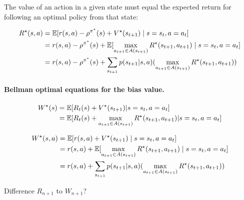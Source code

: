 \documentclass[envcountsame]{llncs}
\begin{document}
The value of an action in a given state must equal the expected return for following an optimal
policy from that state:

\begin{align*}
  R^{\star}(s,a) & = \operatorname*{\mathbb{E}} [ r(s,a) - \rho^{\pi^{\star}}(s) + V^{\star}(s_{t+1})  \mid s=s_{t},a=a_{t} ]\\
                 & = r(s,a) - \rho^{\pi^{\star}}(s) + \operatorname*{\mathbb{E}} [ \max_{a_{t+1} \in A(s_{t+1})}R^{\star}(s_{t+1},a_{t+1}) \mid s=s_{t},a=a_{t}]\\
                 & = r(s,a) - \rho^{\pi^{\star}}(s) + \sum_{s_{t+1}} p(s_{t+1} | s, a) (\max_{a_{t+1} \in A(s_{t+1})} R^{\star}(s_{t+1},a_{t+1}))
\end{align*}

\paragraph*{Bellman optimal equations for the bias value.}


\begin{align*}
  W^{\star}(s) & = \operatorname*{\mathbb{E}} [ R_{t}(s) + V^{\star}(s_{t+1}) | s = s_{t}, a=a_{t} ]\\
               & = \operatorname*{\mathbb{E}} [ R_{t}(s) + \max_{a_{t+1} \in A(s_{t+1})} R^{\star}(s_{t+1},a_{t+1}) | s = s_{t} , a=a_{t}]\\
\end{align*}


\begin{align*}
  W^{\star}(s,a) & = \operatorname*{\mathbb{E}} [ r(s,a) + V^{\star}(s_{t+1}) \mid s=s_{t}, a=a_{t} ] \\
                 & = r(s,a) + \operatorname*{\mathbb{E}} [  \max_{a_{t+1} \in A(s_{t+1})} R^{\star}(s_{t+1},a_{t+1}) \mid s=s_{t}, a=a_{t} ]\\
                 & = r(s,a) + \sum_{s_{t+1}} p(s_{t+1} | s, a) (\max_{a_{t+1} \in A(s_{t+1})} R^{\star}(s_{t+1},a_{t+1}))
\end{align*}


Difference \(R_{n+1}\) to \(W_{n+1}\)?
\end{document}
